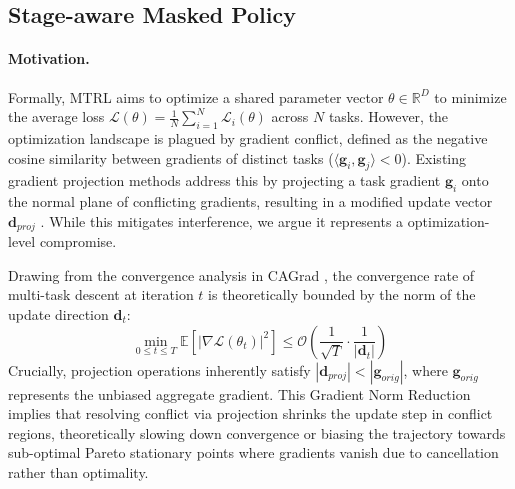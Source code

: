 \documentclass{article}
\begin{document}
\subsection{Stage-aware Masked Policy}

\paragraph{Motivation.}

Formally, MTRL aims to optimize a shared parameter vector $\theta \in \mathbb{R}^D$ to minimize the average loss 
$\mathcal{L}(\theta) = \frac{1}{N}\sum_{i=1}^N \mathcal{L}_i(\theta)$ across $N$ tasks.
However, the optimization landscape is plagued by gradient conflict, defined as the negative cosine similarity between gradients of distinct tasks ($\langle \mathbf{g}_i, \mathbf{g}_j \rangle < 0$).
Existing gradient projection methods address this by projecting a task gradient $\mathbf{g}_i$ onto the normal plane of conflicting gradients, resulting in a modified update vector $\mathbf{d}_{proj}$ \cite{i12,i14}.
While this mitigates interference, we argue it represents a optimization-level compromise.


Drawing from the convergence analysis in CAGrad \cite{i12}, the convergence rate of multi-task descent at iteration $t$ is theoretically bounded by the norm of the update direction $\mathbf{d}_t$:
\begin{equation}
\min_{0 \le t \le T} \mathbb{E}\left[ |\nabla \mathcal{L}(\theta_t)|^2 \right] \le \mathcal{O}\left( \frac{1}{\sqrt{T}} \cdot \frac{1}{|\mathbf{d}_t|} \right)
\label{eq:convergence_bound}
\end{equation}
Crucially, projection operations inherently satisfy 
$|\mathbf{d}_{proj}| < |\mathbf{g}_{orig}|$, where $\mathbf{g}_{orig}$ represents the unbiased aggregate gradient. 
This Gradient Norm Reduction implies that resolving conflict via projection shrinks the update step in conflict regions, theoretically slowing down convergence or biasing the trajectory towards sub-optimal Pareto stationary points where gradients vanish due to cancellation rather than optimality.



\end{document}
